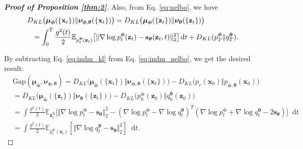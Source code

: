 \documentclass{article}
\theoremstyle{definition}
\theoremstyle{remark}
\newcommand*\diff{\mathop{}\!\mathrm{d}}
\begin{document}
\begin{proof}[\textbf{Proof of Proposition \ref{thm:2}}]
		Also, from Eq. \eqref{eq:nelbo}, we have 
		\begin{eqnarray}
		\begin{split}\label{eq:indm_nelbo}
		\lefteqn{D_{KL}\big(\bm{\mu}_{\bm{\phi}}(\{\mathbf{x}_{t}\})\Vert\bm{\nu}_{\bm{\phi},\bm{\theta}}(\{\mathbf{x}_{t}\})\big)=D_{KL}\big(\bm{\mu}_{\bm{\phi}}(\{\mathbf{z}_{t}\})\Vert\bm{\nu}_{\bm{\theta}}(\{\mathbf{z}_{t}\})\big)}&\\
		&&=\int_{0}^{T}\frac{g^{2}(t)}{2}\mathbb{E}_{p_{t}^{\bm{\phi}}(\mathbf{z}_{t})}\big[\Vert\nabla\log{p_{t}^{\bm{\phi}}(\mathbf{z}_{t})}-\mathbf{s}_{\bm{\theta}}(\mathbf{z}_{t},t)\Vert_{2}^{2}\big]\diff t+D_{KL}(p_{T}^{\bm{\phi}}\Vert q_{T}^{\bm{\theta}}).
		\end{split}
		\end{eqnarray}
		
		By subtracting Eq. \eqref{eq:indm_kl} from Eq. \eqref{eq:indm_nelbo}, we get the desired result:
		\begin{align*}
		&\text{Gap}(\bm{\mu}_{\bm{\phi}},\bm{\nu}_{\bm{\phi},\bm{\theta}})=D_{KL}\big(\bm{\mu}_{\bm{\phi}}(\{\mathbf{x}_{t}\})\Vert\bm{\nu}_{\bm{\phi},\bm{\theta}}(\{\mathbf{x}_{t}\})\big)-D_{KL}\big(p_{r}(\mathbf{x}_{0})\Vert p_{\bm{\phi},\bm{\theta}}(\mathbf{x}_{0})\big)\\
		&=D_{KL}\big(\bm{\mu}_{\bm{\phi}}(\{\mathbf{z}_{t}\})\Vert\bm{\nu}_{\bm{\theta}}(\{\mathbf{z}_{t}\})\big)-D_{KL}\big(p_{0}^{\bm{\phi}}(\mathbf{z}_{0})\Vert q_{0}^{\bm{\theta}}(\mathbf{z}_{0})\big)\\	
		&=\int\frac{g^{2}(t)}{2}\mathbb{E}_{\mathbf{z}_{t}^{\bm{\phi}}}\bigg[\Vert\nabla\log{p_{t}^{\bm{\phi}}}-\mathbf{s}_{\bm{\theta}}\Vert_{2}^{2}-(\nabla\log{p_{t}^{\bm{\phi}}}-\nabla\log{q_{t}^{\bm{\theta}}})^{T}(\nabla\log{p_{t}^{\bm{\phi}}}+\nabla\log{q_{t}^{\bm{\theta}}}-2\mathbf{s}_{\bm{\theta}})\bigg]\diff t\\
		&=\int\frac{g^{2}(t)}{2}\mathbb{E}_{p_{t}^{\bm{\phi}}(\mathbf{z}_{t})}\left[ \Vert\nabla\log{q_{t}^{\bm{\theta}}}-\mathbf{s}_{\bm{\theta}}\Vert_{2}^{2} \right]\diff t.
		\end{align*}
	\end{proof}
	
\end{document}
